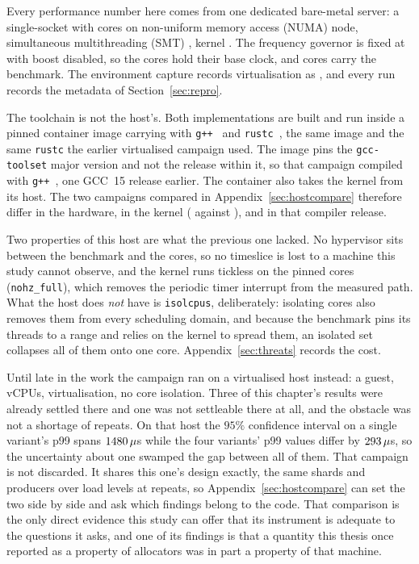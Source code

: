 \documentclass[english,oneside,a4paper,censored,csm,software-track-2020]{HYthesisML}
\begin{document}
Every performance number here comes from one dedicated bare-metal server: a single-socket
\MainCpu{} with \MainCores{} cores on \MainNumaNodes{} non-uniform memory access (NUMA) node,
simultaneous multithreading (SMT) \MainSmt{}, kernel \MainKernel{}. The frequency governor is fixed
at \MainGovernor{} with boost disabled, so the cores hold their base clock, and cores \MainPinned{}
carry the benchmark. The environment capture records virtualisation as \MainVirt{}, and every run
records the metadata of Section~\ref{sec:repro}.

The toolchain is not the host's. Both implementations are built and run inside a pinned container
image carrying \MainDistro{} with \texttt{g++~\MainGpp} and \texttt{rustc~\MainRustc}, the same
image and the same \texttt{rustc} the earlier virtualised campaign used. The image pins the
\texttt{gcc-toolset} major version and not the release within it, so that campaign compiled with
\texttt{g++~\GuestGpp}, one GCC~15 release earlier. The container also takes the kernel from its
host. The two campaigns compared in Appendix~\ref{sec:hostcompare} therefore differ in the
hardware, in the kernel (\MainKernel{} against \GuestKernel{}), and in that compiler release.

Two properties of this host are what the previous one lacked. No hypervisor sits between the
benchmark and the cores, so no timeslice is lost to a machine this study cannot observe, and the
kernel runs tickless on the pinned cores (\texttt{nohz\_full}), which removes the periodic timer
interrupt from the measured path. What the host does \emph{not} have is \texttt{isolcpus},
deliberately: isolating cores also removes them from every scheduling domain, and because the
benchmark pins its threads to a range and relies on the kernel to spread them, an isolated set
collapses all of them onto one core. Appendix~\ref{sec:threats} records the cost.

Until late in the work the campaign ran on a virtualised host instead: a \GuestCpu{} guest,
\GuestCores{} vCPUs, \GuestVirt{} virtualisation, no core isolation. Three of this chapter's
results were already settled there and one was not settleable there at all, and the obstacle was
not a shortage of repeats. On that host the $95\%$ confidence interval on a single variant's p99
spans $1480\,\mu$s while the four variants' p99 values differ by
$293\,\mu$s, so the uncertainty about one swamped the gap between all of them.
That campaign is not discarded. It shares this one's design exactly, the same \GuestShards{}
shards and \GuestProducers{} producers over \GuestLoadLevels{} load levels at \GuestRepeats{}
repeats, so Appendix~\ref{sec:hostcompare} can set the two side by side and ask which findings
belong to the code. That comparison is the only direct evidence this study can offer that its
instrument is adequate to the questions it asks, and one of its findings is that a quantity this
thesis once reported as a property of allocators was in part a property of that machine.
\end{document}
